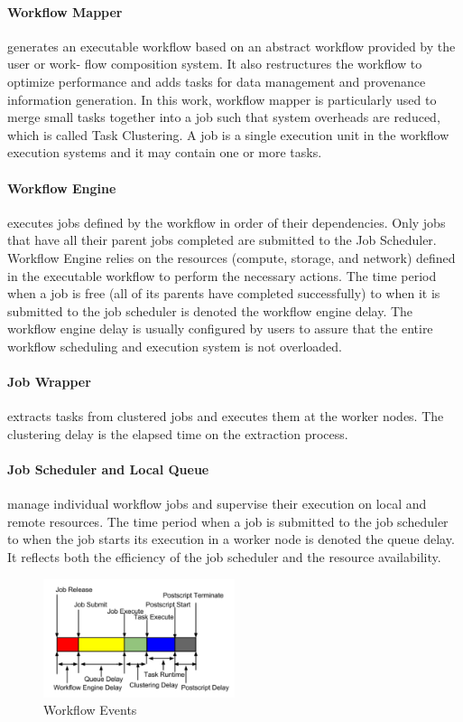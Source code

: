 \documentclass[final,5p,times,twocolumn]{elsarticle}
\begin{document}
\paragraph{Workflow Mapper} generates an executable workflow based on an abstract workflow provided by the user or work- flow composition system. It also restructures the workflow to optimize performance and adds tasks for data management and provenance information generation. In this work, workflow mapper is particularly used to merge small tasks together into a job such that system overheads are reduced, which is called Task Clustering. A job is a single execution unit in the workflow execution systems and it may contain one or more tasks.

\paragraph{Workflow Engine} executes jobs defined by the workflow in order of their dependencies. Only jobs that have all their parent jobs completed are submitted to the Job Scheduler. Workflow Engine relies on the resources (compute, storage, and network) defined in the executable workflow to perform the necessary actions. The time period when a job is free (all of its parents have completed successfully) to when it is submitted to the job scheduler is denoted the workflow engine delay. The workflow engine delay is usually configured by users to assure that the entire workflow scheduling and execution system is not overloaded. 

\paragraph{Job Wrapper} extracts tasks from clustered jobs and executes them at the worker nodes. The clustering delay is the elapsed time on the extraction process.



\paragraph{Job Scheduler and Local Queue} manage individual workflow jobs and supervise their execution on local and remote resources. The time period when a job is submitted to the job scheduler to when the job starts its execution in a worker node is denoted the queue delay. It reflects both the efficiency of the job scheduler and the resource availability. 


\begin{figure}[h!]
	\centering
    \includegraphics[width=0.5\textwidth]{figures/model/overhead.pdf}
    \caption{Workflow Events}
    \label{fig:model_overhead}
\end{figure}
\end{document}
